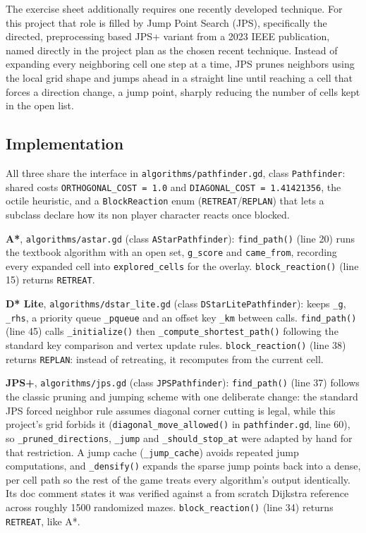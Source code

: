 \documentclass[11pt,a4paper]{article}
\begin{document}
The exercise sheet additionally requires one recently developed technique. For this project that role is filled by Jump Point Search (JPS), specifically the directed, preprocessing based JPS+ variant from a 2023 IEEE publication, named directly in the project plan as the chosen recent technique. Instead of expanding every neighboring cell one step at a time, JPS prunes neighbors using the local grid shape and jumps ahead in a straight line until reaching a cell that forces a direction change, a jump point, sharply reducing the number of cells kept in the open list.

\subsection{Implementation}

All three share the interface in \texttt{algorithms/pathfinder.gd}, class \texttt{Pathfinder}: shared costs \texttt{ORTHOGONAL\_COST = 1.0} and \texttt{DIAGONAL\_COST = 1.41421356}, the octile heuristic, and a \texttt{BlockReaction} enum (\texttt{RETREAT}/\texttt{REPLAN}) that lets a subclass declare how its non player character reacts once blocked.

\textbf{A*}, \texttt{algorithms/astar.gd} (class \texttt{AStarPathfinder}): \texttt{find\_path()} (line 20) runs the textbook algorithm with an open set, \texttt{g\_score} and \texttt{came\_from}, recording every expanded cell into \texttt{explored\_cells} for the overlay. \texttt{block\_reaction()} (line 15) returns \texttt{RETREAT}.

\textbf{D* Lite}, \texttt{algorithms/dstar\_lite.gd} (class \texttt{DStarLitePathfinder}): keeps \texttt{\_g}, \texttt{\_rhs}, a priority queue \texttt{\_pqueue} and an offset key \texttt{\_km} between calls. \texttt{find\_path()} (line 45) calls \texttt{\_initialize()} then \texttt{\_compute\_shortest\_path()} following the standard key comparison and vertex update rules. \texttt{block\_reaction()} (line 38) returns \texttt{REPLAN}: instead of retreating, it recomputes from the current cell.

\textbf{JPS+}, \texttt{algorithms/jps.gd} (class \texttt{JPSPathfinder}): \texttt{find\_path()} (line 37) follows the classic pruning and jumping scheme with one deliberate change: the standard JPS forced neighbor rule assumes diagonal corner cutting is legal, while this project's grid forbids it (\texttt{diagonal\_move\_allowed()} in \texttt{pathfinder.gd}, line 60), so \texttt{\_pruned\_directions}, \texttt{\_jump} and \texttt{\_should\_stop\_at} were adapted by hand for that restriction. A jump cache (\texttt{\_jump\_cache}) avoids repeated jump computations, and \texttt{\_densify()} expands the sparse jump points back into a dense, per cell path so the rest of the game treats every algorithm's output identically. Its doc comment states it was verified against a from scratch Dijkstra reference across roughly 1500 randomized mazes. \texttt{block\_reaction()} (line 34) returns \texttt{RETREAT}, like A*.
\end{document}
